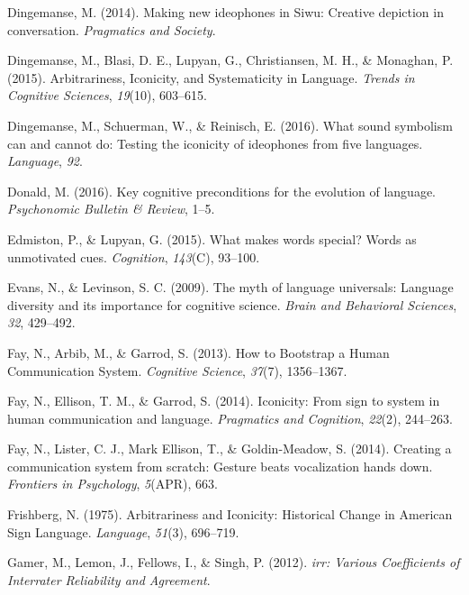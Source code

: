 \documentclass[english,floatsintext,man]{apa6}
\theoremstyle{definition}
\theoremstyle{definition}
\theoremstyle{definition}
\theoremstyle{remark}
\begin{document}
\leavevmode\hypertarget{ref-Dingemanse:2014gj}{}%
Dingemanse, M. (2014). Making new ideophones in Siwu: Creative depiction
in conversation. \emph{Pragmatics and Society}.

\leavevmode\hypertarget{ref-Dingemanse:2015cu}{}%
Dingemanse, M., Blasi, D. E., Lupyan, G., Christiansen, M. H., \&
Monaghan, P. (2015). Arbitrariness, Iconicity, and Systematicity in
Language. \emph{Trends in Cognitive Sciences}, \emph{19}(10), 603--615.

\leavevmode\hypertarget{ref-Dingemanse:2016vd}{}%
Dingemanse, M., Schuerman, W., \& Reinisch, E. (2016). What sound
symbolism can and cannot do: Testing the iconicity of ideophones from
five languages. \emph{Language}, \emph{92}.

\leavevmode\hypertarget{ref-Donald:2016kd}{}%
Donald, M. (2016). Key cognitive preconditions for the evolution of
language. \emph{Psychonomic Bulletin \& Review}, 1--5.

\leavevmode\hypertarget{ref-Edmiston:2015he}{}%
Edmiston, P., \& Lupyan, G. (2015). What makes words special? Words as
unmotivated cues. \emph{Cognition}, \emph{143}(C), 93--100.

\leavevmode\hypertarget{ref-Evans:2009dk}{}%
Evans, N., \& Levinson, S. C. (2009). The myth of language universals:
Language diversity and its importance for cognitive science. \emph{Brain
and Behavioral Sciences}, \emph{32}, 429--492.

\leavevmode\hypertarget{ref-Fay:2013jpa}{}%
Fay, N., Arbib, M., \& Garrod, S. (2013). How to Bootstrap a Human
Communication System. \emph{Cognitive Science}, \emph{37}(7),
1356--1367.

\leavevmode\hypertarget{ref-Fay:2014ih}{}%
Fay, N., Ellison, T. M., \& Garrod, S. (2014). Iconicity: From sign to
system in human communication and language. \emph{Pragmatics and
Cognition}, \emph{22}(2), 244--263.

\leavevmode\hypertarget{ref-Fay:2014cw}{}%
Fay, N., Lister, C. J., Mark Ellison, T., \& Goldin-Meadow, S. (2014).
Creating a communication system from scratch: Gesture beats vocalization
hands down. \emph{Frontiers in Psychology}, \emph{5}(APR), 663.

\leavevmode\hypertarget{ref-Frishberg:1975dh}{}%
Frishberg, N. (1975). Arbitrariness and Iconicity: Historical Change in
American Sign Language. \emph{Language}, \emph{51}(3), 696--719.

\leavevmode\hypertarget{ref-irr:2012}{}%
Gamer, M., Lemon, J., Fellows, I., \& Singh, P. (2012). \emph{irr:
Various Coefficients of Interrater Reliability and Agreement}.
\end{document}
